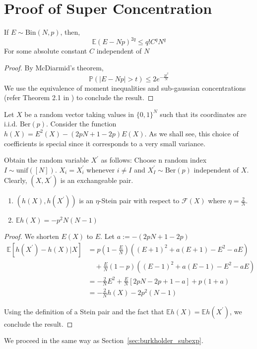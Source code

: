 \documentclass[final,12pt]{colt2018}
\begin{document}
\section{Proof of Super Concentration}
\label{sec:super_concentration}
\begin{lemma}
If $E \sim \mathrm{Bin}(N,p)$, then,
$$\mathbb{E}(E-Np)^{2q} \leq q!C^qN^{q}$$
For some absolute constant $C$ independent of $N$
\label{binomial_subgaussian_moment}
\end{lemma}

\begin{proof}
By McDiarmid's theorem, 
$$\mathbb{P}\left(|E-Np|>t\right) \leq 2e^{-\frac{2t^2}{N}}$$
We use the equivalence of moment inequalities and sub-gaussian concentrations (refer Theorem 2.1 in \citet{boucheron2013concentration}) to conclude the result. 
\end{proof}
Let $X$ be a random vector taking values in $\{0,1\}^N$ such that its coordinates are i.i.d. $\mathrm{Ber}(p)$. Consider the function $h(X) = E^2(X) -(2pN + 1 - 2p)E(X)$. As we shall see, this choice of coefficients is special since it corresponds to a very small variance.

 Obtain the random variable $X^{\prime}$ as follows: Choose n random index $I \sim \mathrm{unif}([N])$. $X_i = X_i^{\prime}$ whenever $i \neq I$ and $X^{\prime}_I \sim \mathrm{Ber}(p)$ independent of $X$. Clearly, $(X,X^{\prime})$ is an exchangeable pair.
\begin{lemma}
\begin{enumerate}
\item
$(h(X),h(X^{\prime}))$ is an $\eta$-Stein pair with respect to $\mathcal{F}(X)$ where $\eta = \frac{2}{N}$. 
\item
$\mathbb{E}h(X) = -p^2N(N-1)$
\end{enumerate}
\end{lemma}
\begin{proof}
We shorten $E(X)$ to $E$. Let $a :=  -(2pN + 1 - 2p)$
\begin{align*}
\mathbb{E}\left[h(X^{\prime}) - h(X) |X\right] &= p\left(1-\tfrac{E}{N}\right)\left( (E+1)^2 + a(E+1) - E^2-aE\right) \\&\quad + \tfrac{E}{N}(1-p)\left((E-1)^2 + a(E-1)-E^2 -aE\right) \\
&= -\tfrac{2}{N}E^2 + \tfrac{E}{N} \left[2pN -2p+1 - a\right] + p(	1+ a) \\
&= -\tfrac{2}{N}h(X) -2p^2(N-1)
\end{align*}

Using the definition of a Stein pair and the fact that $\mathbb{E}h(X) = \mathbb{E}h(X^{\prime})$, we conclude the result.
\end{proof}
We proceed in the same way as Section~\ref{sec:burkholder_subexp}.
\end{document}
